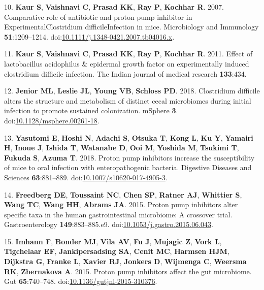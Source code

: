\documentclass[11pt,]{article}
\begin{document}
\hypertarget{ref-Kaur2007}{}
10. \textbf{Kaur S}, \textbf{Vaishnavi C}, \textbf{Prasad KK},
\textbf{Ray P}, \textbf{Kochhar R}. 2007. Comparative role of antibiotic
and proton pump inhibitor in ExperimentalClostridium difficileInfection
in mice. Microbiology and Immunology \textbf{51}:1209--1214.
doi:\href{https://doi.org/10.1111/j.1348-0421.2007.tb04016.x}{10.1111/j.1348-0421.2007.tb04016.x}.

\hypertarget{ref-kaur2011effect}{}
11. \textbf{Kaur S}, \textbf{Vaishnavi C}, \textbf{Prasad KK},
\textbf{Ray P}, \textbf{Kochhar R}. 2011. Effect of lactobacillus
acidophilus \& epidermal growth factor on experimentally induced
clostridium difficile infection. The Indian journal of medical research
\textbf{133}:434.

\hypertarget{ref-Jenior2018}{}
12. \textbf{Jenior ML}, \textbf{Leslie JL}, \textbf{Young VB},
\textbf{Schloss PD}. 2018. Clostridium difficile alters the structure
and metabolism of distinct cecal microbiomes during initial infection to
promote sustained colonization. mSphere \textbf{3}.
doi:\href{https://doi.org/10.1128/msphere.00261-18}{10.1128/msphere.00261-18}.

\hypertarget{ref-Yasutomi2018}{}
13. \textbf{Yasutomi E}, \textbf{Hoshi N}, \textbf{Adachi S},
\textbf{Otsuka T}, \textbf{Kong L}, \textbf{Ku Y}, \textbf{Yamairi H},
\textbf{Inoue J}, \textbf{Ishida T}, \textbf{Watanabe D}, \textbf{Ooi
M}, \textbf{Yoshida M}, \textbf{Tsukimi T}, \textbf{Fukuda S},
\textbf{Azuma T}. 2018. Proton pump inhibitors increase the
susceptibility of mice to oral infection with enteropathogenic bacteria.
Digestive Diseases and Sciences \textbf{63}:881--889.
doi:\href{https://doi.org/10.1007/s10620-017-4905-3}{10.1007/s10620-017-4905-3}.

\hypertarget{ref-Freedberg2015}{}
14. \textbf{Freedberg DE}, \textbf{Toussaint NC}, \textbf{Chen SP},
\textbf{Ratner AJ}, \textbf{Whittier S}, \textbf{Wang TC}, \textbf{Wang
HH}, \textbf{Abrams JA}. 2015. Proton pump inhibitors alter specific
taxa in the human gastrointestinal microbiome: A crossover trial.
Gastroenterology \textbf{149}:883--885.e9.
doi:\href{https://doi.org/10.1053/j.gastro.2015.06.043}{10.1053/j.gastro.2015.06.043}.

\hypertarget{ref-Imhann2015}{}
15. \textbf{Imhann F}, \textbf{Bonder MJ}, \textbf{Vila AV}, \textbf{Fu
J}, \textbf{Mujagic Z}, \textbf{Vork L}, \textbf{Tigchelaar EF},
\textbf{Jankipersadsing SA}, \textbf{Cenit MC}, \textbf{Harmsen HJM},
\textbf{Dijkstra G}, \textbf{Franke L}, \textbf{Xavier RJ},
\textbf{Jonkers D}, \textbf{Wijmenga C}, \textbf{Weersma RK},
\textbf{Zhernakova A}. 2015. Proton pump inhibitors affect the gut
microbiome. Gut \textbf{65}:740--748.
doi:\href{https://doi.org/10.1136/gutjnl-2015-310376}{10.1136/gutjnl-2015-310376}.
\end{document}
